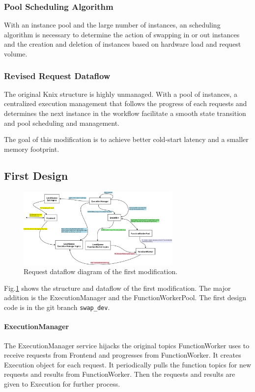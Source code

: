 \documentclass[conference]{IEEEtran}
\begin{document}
\subsubsection{Pool Scheduling Algorithm}
With an instance pool and the large number of instances, an scheduling algorithm is necessary to determine the action of swapping in or out instances and the creation and deletion of instances based on hardware load and request volume.

\subsubsection{Revised Request Dataflow}
The original Knix structure is highly unmanaged. With a pool of instances, a centralized execution management that follows the progress of each requests and determines the next instance in the workflow facilitate a smooth state transition and pool scheduling and management.

The goal of this modification is to achieve better cold-start latency and a smaller memory footprint.

\subsection{First Design}
\begin{figure}
    \centering
    \includegraphics[width=8cm]{knix_new.png}
    \caption{Request dataflow diagram of the first modification.}
    \label{knix_new}
\end{figure}
Fig.\ref{knix_new} shows the structure and dataflow of the first modification. The major addition is the ExecutionManager and the FunctionWorkerPool. The first design code is in the git branch \verb|swap_dev|.

\paragraph{ExecutionManager}
The ExecutionManager service hijacks the original topics FunctionWorker uses to receive requests from Frontend and progresses from FunctionWorker. It creates Execution object for each request. It periodically pulls the function topics for new requests and results from FunctionWorker. Then the requests and results are given to Execution for further process.
\end{document}
